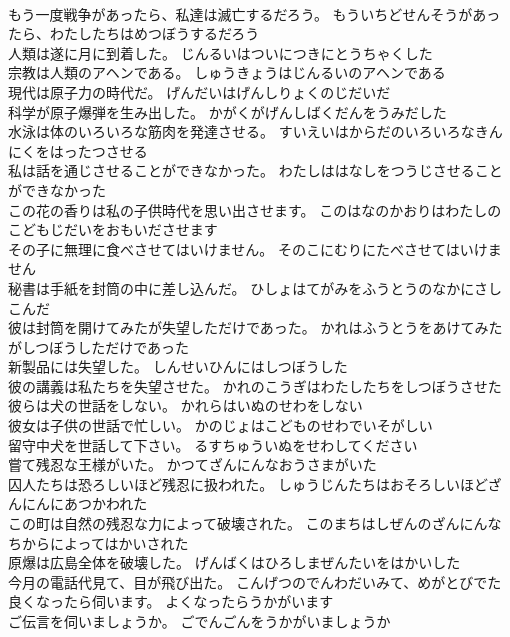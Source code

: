 \documentclass[8pt]{extreport}
\begin{document}
\begin{CJK}{UTF8}{min}
\\	もう一度戦争があったら、私達は滅亡するだろう。	もういちどせんそうがあったら、わたしたちはめつぼうするだろう 
\\	人類は遂に月に到着した。	じんるいはついにつきにとうちゃくした 
\\	宗教は人類のアヘンである。	しゅうきょうはじんるいのアヘンである 
\\	現代は原子力の時代だ。	げんだいはげんしりょくのじだいだ 
\\	科学が原子爆弾を生み出した。	かがくがげんしばくだんをうみだした 
\\	水泳は体のいろいろな筋肉を発達させる。	すいえいはからだのいろいろなきんにくをはったつさせる 
\\	私は話を通じさせることができなかった。	わたしははなしをつうじさせることができなかった 
\\	この花の香りは私の子供時代を思い出させます。	このはなのかおりはわたしのこどもじだいをおもいださせます 
\\	その子に無理に食べさせてはいけません。	そのこにむりにたべさせてはいけません 
\\	秘書は手紙を封筒の中に差し込んだ。	ひしょはてがみをふうとうのなかにさしこんだ 
\\	彼は封筒を開けてみたが失望しただけであった。	かれはふうとうをあけてみたがしつぼうしただけであった 
\\	新製品には失望した。	しんせいひんにはしつぼうした 
\\	彼の講義は私たちを失望させた。	かれのこうぎはわたしたちをしつぼうさせた 
\\	彼らは犬の世話をしない。	かれらはいぬのせわをしない 
\\	彼女は子供の世話で忙しい。	かのじょはこどものせわでいそがしい 
\\	留守中犬を世話して下さい。	るすちゅういぬをせわしてください 
\\	嘗て残忍な王様がいた。	かつてざんにんなおうさまがいた 
\\	囚人たちは恐ろしいほど残忍に扱われた。	しゅうじんたちはおそろしいほどざんにんにあつかわれた 
\\	この町は自然の残忍な力によって破壊された。	このまちはしぜんのざんにんなちからによってはかいされた 
\\	原爆は広島全体を破壊した。	げんばくはひろしまぜんたいをはかいした 
\\	今月の電話代見て、目が飛び出た。	こんげつのでんわだいみて、めがとびでた 
\\	良くなったら伺います。	よくなったらうかがいます 
\\	ご伝言を伺いましょうか。	ごでんごんをうかがいましょうか 

\end{CJK}
\end{document}
